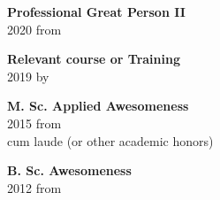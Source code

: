 \documentclass[9pt, blue]{./template/developercv} %
\begin{document}
\hfill
\begin{minipage}[t]{0.32\textwidth}
	\vspace{-\baselineskip} %

	\vspace{1.2mm}
	\begin{minipage}[t]{\linewidth}
		\vspace{-\baselineskip}
		\vspace{0mm}
		\small \textbf{Professional Great Person II} \hfill {} \vspace{-1mm} \\
		\footnotesize 2020 from \textcolor{accentbackground}{}
	\end{minipage}\hfill
	\vspace{1.2em}
	\begin{minipage}[t]{\linewidth}
		\vspace{-\baselineskip}
		\vspace{0mm}
		\small \textbf{Relevant course or Training} \hfill {} \vspace{-1mm} \\
		\footnotesize 2019 by \textcolor{accentbackground}{}
	\end{minipage}\hfill
	\vspace{1.2em}
	\begin{minipage}[t]{\linewidth}
		\vspace{-\baselineskip}
		\vspace{0mm}
		\small \textbf{M. Sc. Applied Awesomeness} \hfill {} \vspace{-1mm} \\
		\footnotesize 2015 from \textcolor{accentbackground}{} \\
		\bpipe cum laude (or other academic honors) \vspace{0pt}
	\end{minipage}\hfill
	\vspace{1.9em}
	\begin{minipage}[t]{\linewidth}
		\vspace{-\baselineskip}
		\vspace{0mm}
		\small \textbf{B. Sc. Awesomeness} \hfill {} \vspace{-1mm} \\
		\footnotesize 2012 from \textcolor{accentbackground}{}
	\end{minipage}
	\hfill
\end{minipage}
\end{document}
